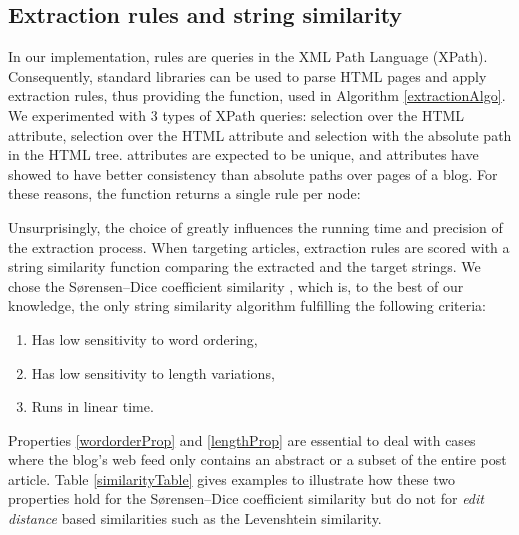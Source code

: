 \subsection{Extraction rules and string similarity}
\label{extractionrulesandstringsimilarity}

In our implementation, rules are queries in the XML Path Language (XPath). Consequently, standard libraries can be used to parse HTML pages and apply extraction rules, thus providing the  function, used in Algorithm \ref{extractionAlgo}. We experimented with 3 types of XPath queries: selection over the HTML  attribute, selection over the HTML  attribute and selection with the absolute path in the HTML tree.  attributes are expected to be unique, and  attributes have showed to have better consistency than absolute paths over pages of a blog. For these reasons, the  function returns a single rule per node:

\allrulesAlgo

Unsurprisingly, the choice of  greatly influences the running time and precision of the extraction process. When targeting articles, extraction rules are scored with a string similarity function comparing the extracted and the target strings. We chose the Sørensen–Dice coefficient similarity \cite{dice1945}, which is, to the best of our knowledge, the only string similarity algorithm fulfilling the following criteria:

\begin{enumerate}
  \item\label{wordorderProp} Has low sensitivity to word ordering,
  \item\label{lengthProp} Has low sensitivity to length variations,
  \item\label{linearProp} Runs in linear time.
\end{enumerate}

Properties \ref{wordorderProp} and \ref{lengthProp} are essential to deal with cases where the blog's web feed only contains an abstract or a subset of the entire post article. Table \ref{similarityTable} gives examples to illustrate how these two properties hold for the Sørensen–Dice coefficient similarity but do not for \emph{edit distance} based similarities such as the Levenshtein \cite{levenshtein1966} similarity.

